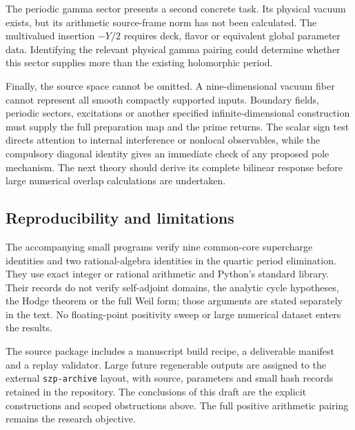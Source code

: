 The periodic gamma sector presents a second concrete task. Its physical vacuum exists, but its arithmetic source-frame norm has not been calculated. The multivalued insertion $-Y/2$ requires deck, flavor or equivalent global parameter data. Identifying the relevant physical gamma pairing could determine whether this sector supplies more than the existing holomorphic period.

Finally, the source space cannot be omitted. A nine-dimensional vacuum fiber cannot represent all smooth compactly supported inputs. Boundary fields, periodic sectors, excitations or another specified infinite-dimensional construction must supply the full preparation map and the prime returns. The scalar sign test directs attention to internal interference or nonlocal observables, while the compulsory diagonal identity gives an immediate check of any proposed pole mechanism. The next theory should derive its complete bilinear response before large numerical overlap calculations are undertaken.

\subsection{Reproducibility and limitations}
The accompanying small programs verify nine common-core supercharge identities and two rational-algebra identities in the quartic period elimination. They use exact integer or rational arithmetic and Python's standard library. Their records do not verify self-adjoint domains, the analytic cycle hypotheses, the Hodge theorem or the full Weil form; those arguments are stated separately in the text. No floating-point positivity sweep or large numerical dataset enters the results.

The source package includes a manuscript build recipe, a deliverable manifest and a replay validator. Large future regenerable outputs are assigned to the external \texttt{szp-archive} layout, with source, parameters and small hash records retained in the repository. The conclusions of this draft are the explicit constructions and scoped obstructions above. The full positive arithmetic pairing remains the research objective.
